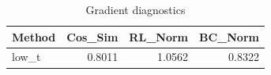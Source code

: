 \begin{table}[htbp]
\centering
\caption{Gradient diagnostics}
\label{tab:grad-diag}
\begin{tabular}{lrrr}
\toprule
\textbf{Method} & \textbf{Cos\_Sim} & \textbf{RL\_Norm} & \textbf{BC\_Norm} \\
\midrule
low\_t & 0.8011 & 1.0562 & 0.8322 \\
\bottomrule
\end{tabular}
\end{table}